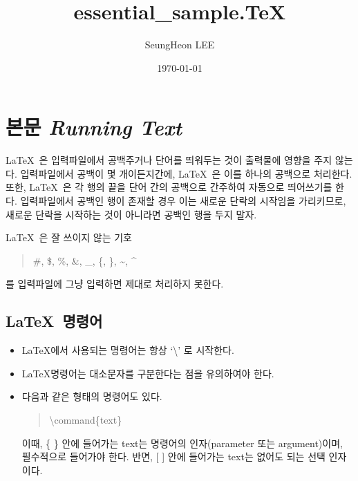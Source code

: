 \documentclass{article}
\begin{document}
\title{essential\_sample.\TeX}
\author{SeungHeon LEE}
\date{\today}
\maketitle

\tableofcontents

\section{본문 \emph{Running Text}}
\LaTeX \ 은 입력파일에서 공백주거나 단어를 띄워두는 것이 출력물에 영향을 주지 않는다. 입력파일에서 공백이 몇 개이든지간에, \LaTeX \ 은 이를 하나의 공백으로 처리한다. 
또한, \LaTeX \ 은 각 행의 끝을 단어 간의 공백으로 간주하여 자동으로 띄어쓰기를 한다. 
입력파일에서 공백인 행이 존재할 경우 이는 새로운 단락의 시작임을 가리키므로, 새로운 단락을 시작하는 것이 아니라면 공백인 행을 두지 말자. 

\LaTeX \ 은 잘 쓰이지 않는 기호 
\begin{quote}
\#, \$, \%, \&, \_, \{, \}, \textasciitilde, \textasciicircum
\end{quote}
를 입력파일에 그냥 입력하면 제대로 처리하지 못한다.

\subsection{\LaTeX \ 명령어}
\begin{itemize}
    \item \LaTeX 에서 사용되는 명령어는 항상 `\textbackslash' 로 시작한다.  
    \item \LaTeX 명령어는 대소문자를 구분한다는 점을 유의하여야 한다.
    \item 다음과 같은 형태의 명령어도 있다. 
    \begin{quote}
        \textbackslash command\{text\}  
    \end{quote}
    이때, \{ \} 안에 들어가는 text는 명령어의 인자(parameter 또는 argument)이며, 필수적으로 들어가야 한다. 
    반면, [ ] 안에 들어가는 text는 없어도 되는 선택 인자이다. 
\end{itemize}
\end{document}
